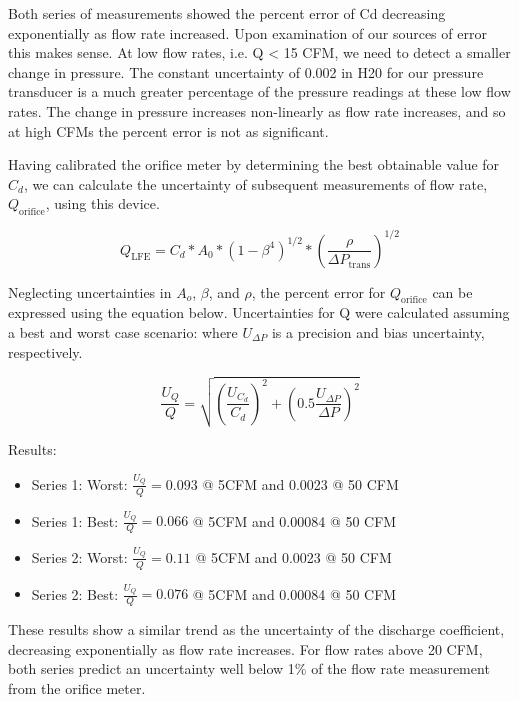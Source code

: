 \documentclass{article}
\begin{document}
Both series of measurements showed the percent error of Cd decreasing exponentially as flow 
rate increased. Upon examination of our sources of error this makes sense. At low flow rates, i.e. Q < 15 
CFM, we need to detect a smaller change in pressure. The constant uncertainty of 0.002 in H20 for our 
pressure transducer is a much greater percentage of the pressure readings at these low flow rates. The 
change in pressure increases non-linearly as flow rate increases, and so at high CFMs the percent error is 
not as significant.

Having calibrated the orifice meter by determining the best obtainable value for $C_d$, we can 
calculate the uncertainty of subsequent measurements of flow rate, $Q_{\text{orifice}}$, using this device.

\begin{equation}
  Q_{\text{LFE}} = C_d * A_0 * (1-\beta^4)^{1/2} * \left(\frac{\rho}{\Delta P_{\text{trans}}}\right)^{1/2}
\end{equation}

Neglecting uncertainties in $A_o$, $\beta$, and $\rho$, the percent error for $Q_{\text{orifice}}$ 
can be expressed using the equation below. Uncertainties for Q were calculated 
assuming a best and worst case scenario: where $U_{\Delta P}$ is a precision
 and bias uncertainty, respectively.

\begin{equation}
  \frac{U_{Q}}{Q} = \sqrt{ \left(\frac{U_{C_d}}{C_d}\right)^2 + \left( 0.5 \frac{U_{\Delta P}}{\Delta P} \right)^2}
\end{equation}

Results:
\begin{itemize}
\item Series 1: Worst: $\frac{U_Q}{Q} = 0.093$ @ 5CFM and 0.0023 @ 50 CFM
\item Series 1: Best:  $\frac{U_Q}{Q} = 0.066$ @ 5CFM and 0.00084 @ 50 CFM
\item Series 2: Worst: $\frac{U_Q}{Q} = 0.11$ @ 5CFM and 0.0023 @ 50 CFM
\item Series 2: Best:  $\frac{U_Q}{Q} = 0.076$ @ 5CFM and 0.00084 @ 50 CFM
\end{itemize}

These results show a similar trend as the uncertainty of the discharge coefficient, decreasing 
exponentially as flow rate increases. For flow rates above 20 CFM, both series predict an uncertainty 
well below 1\% of the flow rate measurement from the orifice meter.
\end{document}
